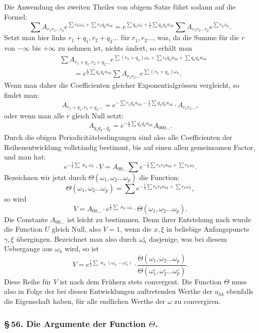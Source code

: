 \documentclass[10pt]{article}
\begin{document}
Die Anwendung des zweiten Theiles von obigem Satze führt sodann auf die Formel:
\[
\sum A_{r_1r_2\ldots r_p}e^{\sum r_h\omega_h+\sum r_hq_ka_{hk}}
=e^{\sum q_h\omega_h+\frac12\sum q_hq_ka_{hk}}\sum A_{r_1r_2\ldots r_p}e^{\sum r_h\omega_h}.
\]
Setzt man hier links \(r_1+q_1,r_2+q_2\ldots\) für \(r_1,r_2\ldots\), was, da die Summe für die \(r\) von \(-\infty\) bis \(+\infty\) zu nehmen ist, nichts ändert, so erhält man
\[
\begin{aligned}
&\sum A_{r_1+q_1,r_2+q_2\ldots}e^{\sum(r_h+q_h)\omega_h+\sum r_hq_ka_{hk}+\sum q_hq_ka_{hk}}\\
&\qquad=e^{\frac12\sum q_hq_ka_{hk}}\sum A_{r_1r_2\ldots}e^{\sum(r_h+q_h)\omega_h}.
\end{aligned}
\]
Wenn man daher die Coefficienten gleicher Exponentialgrössen vergleicht, so findet man:
\[
A_{r_1+q_1,r_2+q_2\ldots}=e^{-\sum r_hq_ka_{hk}-\frac12\sum q_hq_ka_{hk}}\cdot A_{r_1r_2\ldots},
\]
oder wenn man alle \(r\) gleich Null setzt:
\[
A_{q_1q_2\ldots q_p}=e^{-\frac12\sum q_hq_ka_{hk}}A_{000\ldots}.
\]
Durch die obigen Periodicitätsbedingungen sind also alle Coefficienten der Reihenentwicklung vollständig bestimmt, bis auf einen allen gemeinsamen Factor, und man hat:
\[
e^{-\frac12\sum\varkappa_h\omega_h}\cdot V=A_{00\ldots}\sum e^{-\frac12\sum r_hr_ka_{hk}+\sum r_h\omega_h}.
\]
Bezeichnen wir jetzt durch \(\Theta(\omega_1,\omega_2\ldots\omega_p)\) die Function:
\[
\tag{2}\Theta(\omega_1,\omega_2\ldots\omega_p)=\sum e^{-\frac12\sum r_hr_ka_{hk}+\sum r_h\omega_h},
\]
so wird
\[
V=A_{00\ldots}\cdot e^{\frac12\sum\varkappa_h\omega_h}\cdot\Theta(\omega_1,\omega_2\ldots\omega_p).
\]
Die Constante \(A_{00\ldots}\) ist leicht zu bestimmen. Denn ihrer Entstehung nach wurde die Function \(U\) gleich Null, also \(V=1\), wenn die \(x,\xi\) in beliebige Anfangspuncte \(\gamma,\xi\) übergingen. Bezeichnet man also durch \(\omega_h^{\circ}\) dasjenige, was bei diesem Uebergange aus \(\omega_h\) wird, so ist
\[
\tag{3}V=e^{\frac12\sum\varkappa_h(\omega_h-\omega_h^{\circ})}\cdot\frac{\Theta(\omega_1,\omega_2\ldots\omega_p)}{\Theta(\omega_1^{\circ},\omega_2^{\circ}\ldots\omega_p^{\circ})}.
\]
Diese Reihe für \(V\) ist nach dem Frühern stets convergent. Die Function \(\Theta\) muss also in Folge der bei diesen Entwicklungen auftretenden Werthe der \(a_{hk}\) ebenfalls die Eigenschaft haben, für alle endlichen Werthe der \(\omega\) zu convergiren.

\subsubsection*{\S\,56. Die Argumente der Function \(\Theta\).}
\end{document}
